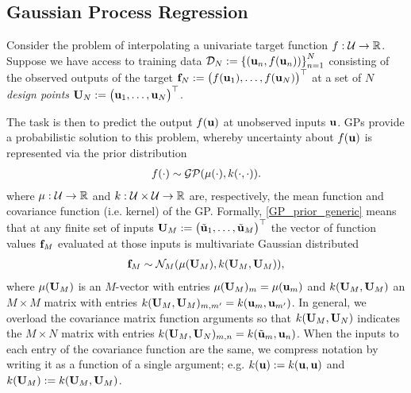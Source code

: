 \documentclass[12pt]{article}
\begin{document}
\subsection{Gaussian Process Regression}
Consider the problem of interpolating a univariate target function $\f: \parSpace \to \R$. Suppose we have access to training data 
$\designData_{\Ndesign} := \left\{(\bpar_{\designIdx}, \f(\bpar_{\designIdx}))\right\}_{\designIdx = 1}^{\Ndesign}$ consisting of the observed outputs of the target 
$\fObs[\Ndesign] :=  \begin{pmatrix} \f(\bpar_1), \dots, \f(\bpar_\Ndesign) \end{pmatrix}^\top$ at a set of $N$ 
\textit{design points} $\designMat[\Ndesign] := \begin{pmatrix} \bpar_1, \dots, \bpar_N \end{pmatrix}^\top$. 

The task is then to predict the output $\f(\bpar)$ at unobserved inputs $\bpar$. GPs provide a probabilistic solution to this problem, 
whereby uncertainty about $\f(\bpar)$ is represented via the prior distribution 
\begin{align}
\f(\cdot) \sim \GP(\GPMean(\cdot), \GPKer(\cdot, \cdot)). \label{GP_prior_generic}
\end{align}
where $\GPMean: \parSpace \to \R$ and $\GPKer: \parSpace \times \parSpace \to \R$ are, respectively, the mean function and covariance function (i.e. kernel)
of the GP. Formally, \ref{GP_prior_generic} means that at any finite set of inputs 
$\designMat[M] := \begin{pmatrix} \tilde{\bpar}_1, \dots, \tilde{\bpar}_{M} \end{pmatrix}^\top$ the vector of function values $\fObs[M]$ evaluated at those inputs 
is multivariate Gaussian distributed
\begin{align}
\fObs[M] \sim \mathcal{N}_{M}(\GPMean(\designMat[M]), \GPKer(\designMat[M], \designMat[M])),
\end{align}
where $\GPMean(\designMat[M])$ is an $M$-vector with entries $\GPMean(\designMat[M])_m = \GPMean(\bpar_m)$ and 
$\GPKer(\designMat[M], \designMat[M])$ an $M \times M$ matrix with entries $\GPKer(\designMat[M], \designMat[M])_{m,m^\prime} = \GPKer(\bpar_m, \bpar_{m^\prime})$.
In general, we overload the covariance matrix function arguments so that $\GPKer(\designMat[M], \designMat[N])$ indicates the $M \times N$ matrix with entries 
$\GPKer(\designMat[M], \designMat[N])_{m,n} = \GPKer(\tilde{\bpar}_m, \bpar_n)$. 
When the inputs to each entry of the covariance function are the same, we compress notation by writing it as a function of a single argument; 
e.g. $\GPKer(\bpar) := \GPKer(\bpar, \bpar)$ and $\GPKer(\designMat[M]) := \GPKer(\designMat[M], \designMat[M])$. 
\end{document}
